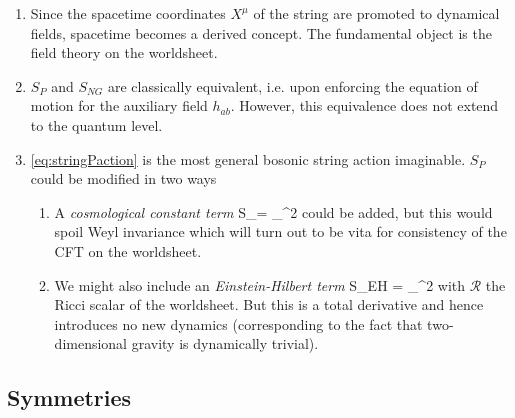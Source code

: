 \begin{enumerate}
\item Since the spacetime coordinates $X^\mu$ of the string are promoted to dynamical fields, spacetime becomes a derived concept. The fundamental object is the field theory on the worldsheet.
\item $S_P$ and $S_{NG}$ are classically equivalent, i.e. upon enforcing the equation of motion for the auxiliary field $h_{ab}$. However, this equivalence does not extend to the quantum level.
\item \ref{eq:stringPaction} is the most general bosonic string action imaginable. $S_P$ could be modified in two ways
\begin{enumerate}
	\item A \emph{cosmological constant term} 
	\bse 
	S_\Lambda = \Lambda \int_\Sigma \md^2 \xi {}
	\ese 
	could be added, but this would spoil Weyl invariance which will turn out to be vita for consistency of the CFT on the worldsheet.
	\item We might also include an \emph{Einstein-Hilbert term}
	\bse 
	S_{EH} =  \int_\Sigma \md^2 \xi {} 
	\ese 
	with $\mathcal{R}$ the Ricci scalar of the worldsheet. But this is a total derivative and hence introduces no new dynamics (corresponding to the fact that two-dimensional gravity is dynamically trivial).
\end{enumerate}
\end{enumerate}
\subsection{Symmetries}
